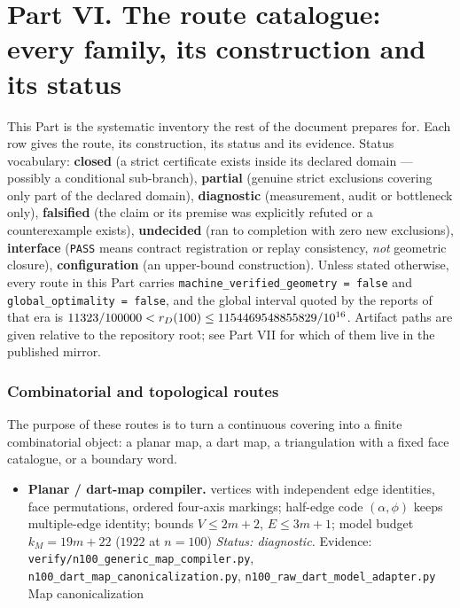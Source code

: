 \part*{Part VI. The route catalogue: every family, its construction and its status}
\setcounter{section}{0}

\noindent
This Part is the systematic inventory the rest of the document prepares for. Each row gives the
route, its construction, its status and its evidence. Status vocabulary:
\textbf{closed} (a strict certificate exists inside its declared domain --- possibly a conditional
sub-branch), \textbf{partial} (genuine strict exclusions covering only part of the declared domain),
\textbf{diagnostic} (measurement, audit or bottleneck only), \textbf{falsified} (the claim or its
premise was explicitly refuted or a counterexample exists), \textbf{undecided} (ran to completion
with zero new exclusions), \textbf{interface} (\texttt{PASS} means contract registration or replay
consistency, \emph{not} geometric closure), \textbf{configuration} (an upper-bound construction).
Unless stated otherwise, every route in this Part carries
\texttt{machine\_\allowbreak{}verified\_\allowbreak{}geometry = false} and \texttt{global\_\allowbreak{}optimality = false}, and the global
interval quoted by the reports of that era is $11323/100000<r_{D}(100)\le1154469548855829/10^{16}$.
Artifact paths are given relative to the repository root; see Part VII for which of them live in the
published mirror.

\section{Combinatorial and topological routes}

The purpose of these routes is to turn a continuous covering into a finite combinatorial object: a
planar map, a dart map, a triangulation with a fixed face catalogue, or a boundary word.

\begin{itemize}[leftmargin=1.2em,itemsep=3pt]
\item \textbf{Planar / dart-map compiler.} vertices with independent edge identities, face permutations, ordered
four-axis markings; half-edge code $(\alpha,\phi)$ keeps multiple-edge identity; bounds
$V\le2m+2$, $E\le3m+1$; model budget $k_M=19m+22$ ($1922$ at $n=100$) \emph{Status: diagnostic.} Evidence: \texttt{verify/\allowbreak{}n100\_\allowbreak{}generic\_\allowbreak{}map\_\allowbreak{}compiler.py}, \texttt{n100\_\allowbreak{}dart\_\allowbreak{}map\_\allowbreak{}canonicalization.py},
\texttt{n100\_\allowbreak{}raw\_\allowbreak{}dart\_\allowbreak{}model\_\allowbreak{}adapter.py} \\
Map canonicalization
\end{itemize}



